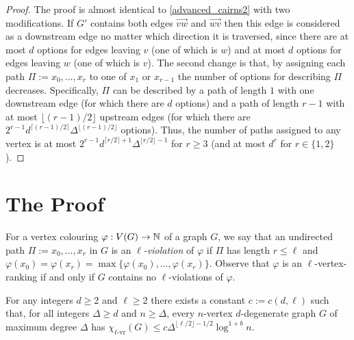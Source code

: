 \documentclass{patmorin}
\newcommand{\defin}[1]{\emph{\color{brightmaroon}#1}}
\newcommand{\rn}[1]{\chi_{\operatorname{#1-vr}}}
\newcommand{\lrn}{\rn{\ell}}
\begin{document}
\begin{proof}
  The proof is almost identical to \cref{advanced_cairns2} with two modifications.  If $G'$ contains both edges $\overrightarrow{vw}$ and $\overrightarrow{wv}$ then this edge is considered as a downstream edge no matter which direction it is traversed, since there are at most $d$ options for edges leaving $v$ (one of which is $w$) and at most $d$ options for edges leaving $w$ (one of which is $v$).  The second change is that, by assigning each path $\Pi:=x_0,\ldots,x_r$ to one of $x_1$ or $x_{r-1}$ the number of options for describing $\Pi$ decreases.  Specifically, $\Pi$ can be described by a path of length $1$ with one downstream edge (for which there are $d$ options) and a path of length $r-1$ with at most $\lfloor (r-1)/2\rfloor$ upstream edges (for which there are $2^{r-1}d^{\lceil (r-1)/2\rceil}\Delta^{\lfloor(r-1)/2\rfloor}$ options).  Thus, the number of paths assigned to any vertex is at most $2^{r-1}d^{\lceil r/2\rceil+1}\Delta^{\lfloor r/2\rfloor-1}$ for $r\ge 3$ (and at most $d^r$ for $r\in\{1,2\}$).
\end{proof}


\section{The Proof}

For a vertex colouring $\varphi:V(G)\to\mathbb{N}$ of a graph $G$, we say that an undirected path $\Pi:=x_0,\ldots,x_r$ in $G$ is an \defin{$\ell$-violation} of $\varphi$ if $\Pi$ has length $r\le\ell$ and $\varphi(x_0)=\varphi(x_r)=\max\{\varphi(x_0),\ldots,\varphi(x_r)\}$.  Observe that $\varphi$ is an $\ell$-vertex-ranking if and only if $G$ contains no $\ell$-violations of $\varphi$.

\begin{thm}\label{l_degenerate_and_degree}
  For any integers $d\ge 2$ and $\ell\ge 2$ there exists a constant $c:=c(d,\ell)$ such that, for all integers $\Delta\ge d$ and $n\ge \Delta$, every $n$-vertex $d$-degenerate graph $G$ of maximum degree $\Delta$ has $\lrn(G)\le c\Delta^{\lfloor\ell/2\rfloor-1/2}\log^{1+b} n$.
\end{thm}
\end{document}
